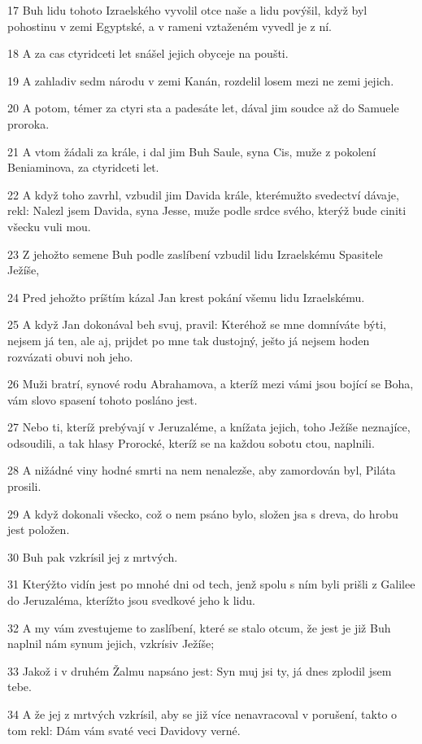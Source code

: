 \par 17 Buh lidu tohoto Izraelského vyvolil otce naše a lidu povýšil, když byl pohostinu v zemi Egyptské, a v rameni vztaženém vyvedl je z ní.
\par 18 A za cas ctyridceti let snášel jejich obyceje na poušti.
\par 19 A zahladiv sedm národu v zemi Kanán, rozdelil losem mezi ne zemi jejich.
\par 20 A potom, témer za ctyri sta a padesáte let, dával jim soudce až do Samuele proroka.
\par 21 A vtom žádali za krále, i dal jim Buh Saule, syna Cis, muže z pokolení Beniaminova, za ctyridceti let.
\par 22 A když toho zavrhl, vzbudil jim Davida krále, kterémužto svedectví dávaje, rekl: Nalezl jsem Davida, syna Jesse, muže podle srdce svého, kterýž bude ciniti všecku vuli mou.
\par 23 Z jehožto semene Buh podle zaslíbení vzbudil lidu Izraelskému Spasitele Ježíše,
\par 24 Pred jehožto príštím kázal Jan krest pokání všemu lidu Izraelskému.
\par 25 A když Jan dokonával beh svuj, pravil: Kteréhož se mne domníváte býti, nejsem já ten, ale aj, prijdet po mne tak dustojný, ješto já nejsem hoden rozvázati obuvi noh jeho.
\par 26 Muži bratrí, synové rodu Abrahamova, a kteríž mezi vámi jsou bojící se Boha, vám slovo spasení tohoto posláno jest.
\par 27 Nebo ti, kteríž prebývají v Jeruzaléme, a knížata jejich, toho Ježíše neznajíce, odsoudili, a tak hlasy Prorocké, kteríž se na každou sobotu ctou, naplnili.
\par 28 A nižádné viny hodné smrti na nem nenalezše, aby zamordován byl, Piláta prosili.
\par 29 A když dokonali všecko, což o nem psáno bylo, složen jsa s dreva, do hrobu jest položen.
\par 30 Buh pak vzkrísil jej z mrtvých.
\par 31 Kterýžto vidín jest po mnohé dni od tech, jenž spolu s ním byli prišli z Galilee do Jeruzaléma, kterížto jsou svedkové jeho k lidu.
\par 32 A my vám zvestujeme to zaslíbení, které se stalo otcum, že jest je již Buh naplnil nám synum jejich, vzkrísiv Ježíše;
\par 33 Jakož i v druhém Žalmu napsáno jest: Syn muj jsi ty, já dnes zplodil jsem tebe.
\par 34 A že jej z mrtvých vzkrísil, aby se již více nenavracoval v porušení, takto o tom rekl: Dám vám svaté veci Davidovy verné.
